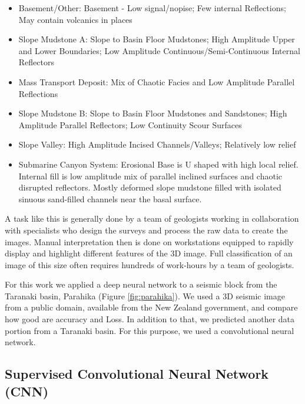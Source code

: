 \documentclass[twoside,letterpaper,twocolumn]{article}
\begin{document}
\begin{itemize}
 \item Basement/Other: Basement - Low signal/nopise; Few internal Reflections; May contain volcanics in places
 
 \item Slope Mudstone A: Slope to Basin Floor Mudstones; High Amplitude Upper and Lower Boundaries; Low Amplitude Continuous/Semi-Continuous Internal Reflectors
 
 \item Mass Transport Deposit: Mix of Chaotic Facies and Low Amplitude Parallel Reflections
 
 \item Slope Mudstone B: Slope to Basin Floor Mudstones and Sandstones; High Amplitude Parallel Reflectors; Low Continuity Scour Surfaces
 
 
 \item Slope Valley: High Amplitude Incised Channels/Valleys; Relatively low relief
 
 \item Submarine Canyon System: Erosional Base is U shaped with high local relief. Internal fill is low amplitude mix of parallel inclined surfaces and chaotic disrupted reflectors. Mostly deformed slope mudstone filled with isolated sinuous sand-filled channels near the basal surface.
\end{itemize}
A task like this is generally done by a team of geologists working in collaboration with specialists who design the surveys and process the raw data to create the images. 
Manual interpretation then is done on workstations equipped to rapidly display and highlight different features of the 3D image. 
Full classification of an image of this size often requires hundreds of work-hours by a team of geologists.



For this work we applied a deep neural network to a seismic block from the Taranaki basin, Parahika (Figure \ref{fig:parahika}). 
We used a 3D seismic image from a public domain, available from the New Zealand government, and compare how good are accuracy and Loss. 
In addition to that, we predicted another data portion from a Taranaki basin. 
For this purpose, we used a convolutional neural network.

\subsection{Supervised Convolutional Neural Network (CNN)}
\end{document}
